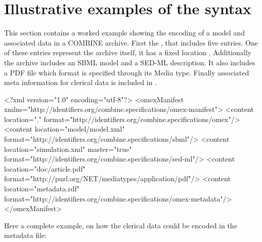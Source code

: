 
\section{Illustrative examples of the syntax}
\label{examples}

This section contains a worked example showing the encoding of a model 
and associated data in a COMBINE archive. First the \OmexManifest, that 
includes five entries. One of these entries represent the archive itself, 
it has a fixed location . Additionally 
the archive includes an SBML model and a SED-ML description. It also 
includes a PDF file which format is specified through its Media type. Finally 
associated meta information for clerical data is included in 
. 


\begin{example}
<?xml version="1.0" encoding="utf-8"?>
<omexManifest xmlns="http://identifiers.org/combine.specifications/omex-manifest">
    <content location="." 
		         format="http://identifiers.org/combine.specifications/omex"/>
    <content location="model/model.xml" 
		         format="http://identifiers.org/combine.specifications/sbml"/>
    <content location="simulation.xml" master="true"
		         format="http://identifiers.org/combine.specifications/sed-ml"/>
    <content location="doc/article.pdf" 
		         format="http://purl.org/NET/mediatypes/application/pdf"/>
    <content location="metadata.rdf" 
		         format="http://identifiers.org/combine.specifications/omex-metadata"/>
</omexManifest>
\end{example}

Here a complete example, on how the clerical data could be encoded in the metadata file: 

